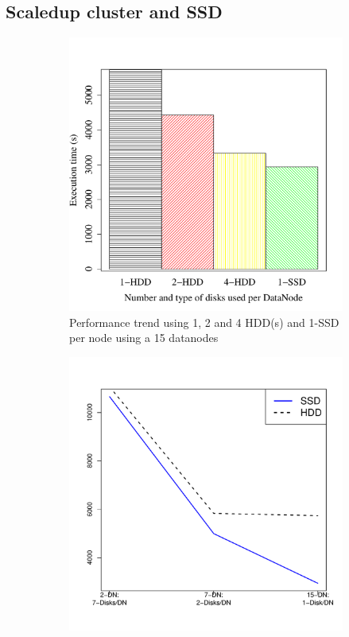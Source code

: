 \documentclass[conference]{IEEEtran}
\begin{document}
\subsection {Scaledup cluster and SSD} \label{ScaledupClusterAndSSD}
\begin{figure}[h]
  \centering
  \begin{subfigure}[b]{0.23\textwidth}
          \includegraphics[width=\textwidth]{Figure/PerormanceData/Plots/SSDHDDSameNode.pdf}
          \caption{Performance trend using 1, 2 and 4 HDD(s) and 1-SSD per node using a 15 datanodes}
          \label{fig:SsdN4Hdd}
  \end{subfigure}
  \begin{subfigure}[b]{0.23\textwidth}
          \includegraphics[width=\textwidth]{Figure/PerormanceData/Plots/SSDHDDDiffNode.pdf}

\end{subfigure}
\end{figure}
\end{document}
